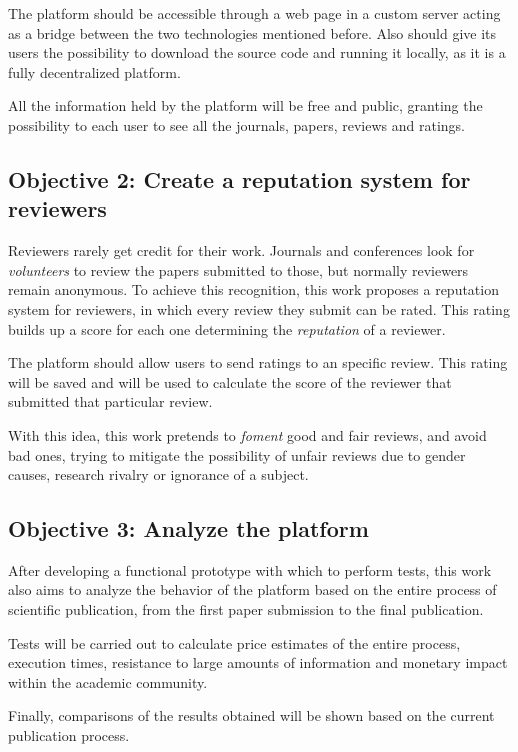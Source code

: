 The platform should be accessible through a web page in a custom server acting
as a bridge between the two technologies mentioned before. Also should give its
users the possibility to download the source code and running it locally, as it
is a fully decentralized platform.

All the information held by the platform will be free and public, granting the
possibility to each user to see all the journals, papers, reviews and ratings.

\subsection*{Objective 2: Create a reputation system for reviewers}

Reviewers rarely get credit for their work. Journals and conferences look for
\emph{volunteers} to review the papers submitted to those, but normally
reviewers remain anonymous. To achieve this recognition, this work proposes a
reputation system for reviewers, in which every review they submit can be rated.
This rating builds up a score for each one determining the \emph{reputation} of
a reviewer.

The platform should allow users to send ratings to an specific review. This
rating will be saved and will be used to calculate the score of the reviewer
that submitted that particular review.

With this idea, this work pretends to \emph{foment} good and fair reviews, and
avoid bad ones, trying to mitigate the possibility of unfair reviews due to
gender causes, research rivalry or ignorance of a subject.

\subsection*{Objective 3: Analyze the platform}

After developing a functional prototype with which to perform tests, this work
also aims to analyze the behavior of the platform based on the entire process of
scientific publication, from the first paper submission to the final
publication.

Tests will be carried out to calculate price estimates of the entire process,
execution times, resistance to large amounts of information and monetary impact
within the academic community.

Finally, comparisons of the results obtained will be shown based on the current
publication process.

